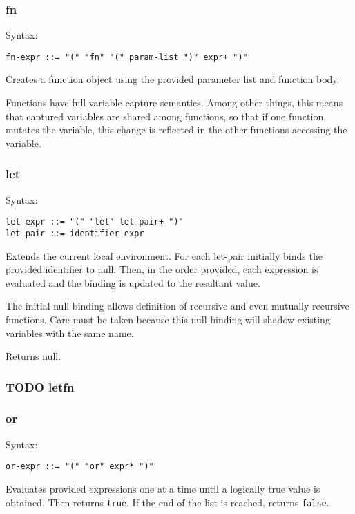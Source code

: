 \documentclass[11pt]{article}
\begin{document}
\subsubsection{fn}
\label{sec:org0edb310}
Syntax:
\begin{verbatim}
fn-expr ::= "(" "fn" "(" param-list ")" expr+ ")"
\end{verbatim}

Creates a function object using the provided parameter list and function body.

Functions have full variable capture semantics. Among other things, this means
that captured variables are shared among functions, so that if one function
mutates the variable, this change is reflected in the other functions accessing
the variable.

\subsubsection{let}
\label{sec:org86dee5a}
Syntax:
\begin{verbatim}
let-expr ::= "(" "let" let-pair+ ")"
let-pair ::= identifier expr
\end{verbatim}

Extends the current local environment. For each let-pair initially binds the
provided identifier to null. Then, in the order provided, each expression is
evaluated and the binding is updated to the resultant value.

The initial null-binding allows definition of recursive and even mutually
recursive functions. Care must be taken because this null binding will shadow
existing variables with the same name.

Returns null.

\subsubsection{{\bfseries\sffamily TODO} letfn}
\label{sec:orgc57dccf}
\subsubsection{or}
\label{sec:org94bce3a}
Syntax:
\begin{verbatim}
or-expr ::= "(" "or" expr* ")"
\end{verbatim}

Evaluates provided expressions one at a time until a logically true value is
obtained. Then returns \texttt{true}. If the end of the list is reached, returns \texttt{false}.
\end{document}
